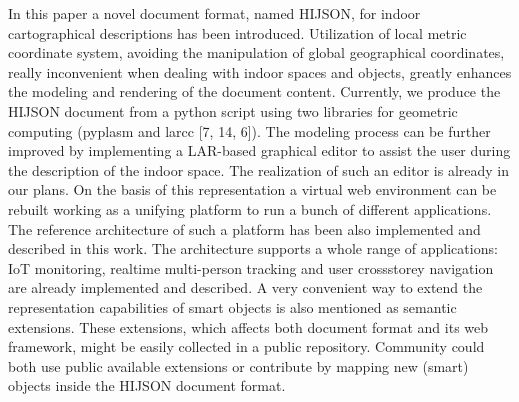 \documentclass{sig-alternate}
\begin{document}
In this paper a novel document format, named HIJSON, for indoor cartographical
descriptions has been introduced. Utilization of local metric coordinate
system, avoiding the manipulation of global geographical coordinates, really
inconvenient when dealing with indoor spaces and objects, greatly enhances the
modeling and rendering of the document content. Currently, we produce the
HIJSON document from a python script using two libraries for geometric
computing (pyplasm and larcc [7, 14, 6]). The modeling process can be further
improved by implementing a LAR-based graphical editor to assist the user
during the description of the indoor space. The realization of such an editor
is already in our plans. On the basis of this representation a virtual web
environment can be rebuilt working as a unifying platform to run a bunch of
different applications. The reference architecture of such a platform has been
also implemented and described in this work. The architecture supports a whole
range of applications: IoT monitoring, realtime multi-person tracking and user
crossstorey navigation are already implemented and described. A very
convenient way to extend the representation capabilities of smart objects is
also mentioned as semantic extensions. These extensions, which affects both
document format and its web framework, might be easily collected in a public
repository. Community could both use public available extensions or contribute
by mapping new (smart) objects inside the HIJSON document format.


\end{document}
